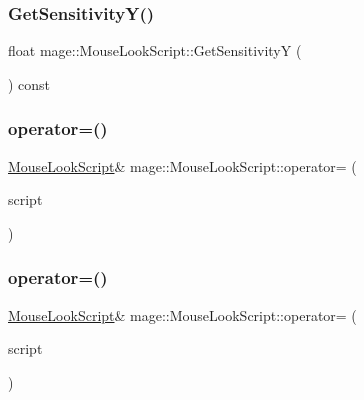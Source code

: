 \hypertarget{classmage_1_1_mouse_look_script_a154e0de56755e927ee0731a6f3159e55}{}\label{classmage_1_1_mouse_look_script_a154e0de56755e927ee0731a6f3159e55} 
\subsubsection{\texorpdfstring{Get\+Sensitivity\+Y()}{GetSensitivityY()}}
{\footnotesize\ttfamily float mage\+::\+Mouse\+Look\+Script\+::\+Get\+SensitivityY (\begin{DoxyParamCaption}{ }\end{DoxyParamCaption}) const}

\hypertarget{classmage_1_1_mouse_look_script_a13fba7e90bf10d24814e0a8cec25645e}{}\label{classmage_1_1_mouse_look_script_a13fba7e90bf10d24814e0a8cec25645e} 
\subsubsection{\texorpdfstring{operator=()}{operator=()}\hspace{0.1cm}{\footnotesize\ttfamily [1/2]}}
{\footnotesize\ttfamily \hyperlink{classmage_1_1_mouse_look_script}{Mouse\+Look\+Script}\& mage\+::\+Mouse\+Look\+Script\+::operator= (\begin{DoxyParamCaption}\item[{const \hyperlink{classmage_1_1_mouse_look_script}{Mouse\+Look\+Script} \&}]{script }\end{DoxyParamCaption})\hspace{0.3cm}{\ttfamily [delete]}}

\hypertarget{classmage_1_1_mouse_look_script_a2754174f5595fa424471c631818dc2b6}{}\label{classmage_1_1_mouse_look_script_a2754174f5595fa424471c631818dc2b6} 
\subsubsection{\texorpdfstring{operator=()}{operator=()}\hspace{0.1cm}{\footnotesize\ttfamily [2/2]}}
{\footnotesize\ttfamily \hyperlink{classmage_1_1_mouse_look_script}{Mouse\+Look\+Script}\& mage\+::\+Mouse\+Look\+Script\+::operator= (\begin{DoxyParamCaption}\item[{\hyperlink{classmage_1_1_mouse_look_script}{Mouse\+Look\+Script} \&\&}]{script }\end{DoxyParamCaption})\hspace{0.3cm}{\ttfamily [delete]}}

